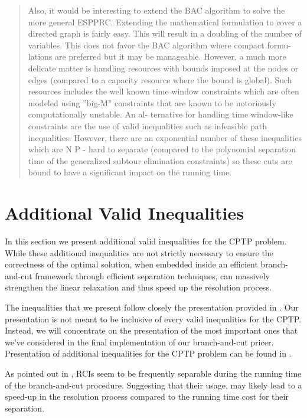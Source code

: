\begin{quote}
	\cite{jepsen2008}
	Also, it would be interesting to extend the BAC algorithm to solve the more general ESPPRC.
	Extending the mathematical formulation to cover a directed graph is fairly easy. This will result in a
	doubling of the number of variables. This does not favor the BAC algorithm where compact formu-
	lations are preferred but it may be manageable. However, a much more delicate matter is handling
	resources with bounds imposed at the nodes or edges (compared to a capacity resource where the
	bound is global). Such resources includes the well known time window constraints which are often
	modeled using ”big-M” constraints that are known to be notoriously computationally unstable. An al-
	ternative for handling time window-like constraints are the use of valid inequalities such as infeasible
	path inequalities. However, there are an exponential number of these inequalities which are N P -
	hard to separate (compared to the polynomial separation time of the generalized subtour elimination
	constraints) so these cuts are bound to have a significant impact on the running time.
\end{quote}


\section{Additional Valid Inequalities}
\label{sec:cptp-additional-valid-inequalities}

In this section we present additional valid inequalities for the CPTP problem.
While these additional inequalities are not strictly necessary
to ensure the correctness of the optimal solution,
when embedded inside an efficient branch-and-cut framework through efficient separation techniques,
can massively strengthen the linear relaxation and thus speed up the resolution process.

The inequalities that we present follow closely the presentation provided in \textcite{jepsen2014}.
Our presentation is not meant to be inclusive of every valid inequalities for the CPTP.
Instead, we will concentrate on the presentation of the most important ones
that we've considered in the final implementation of our branch-and-cut pricer.
Presentation of additional inequalities for the CPTP problem can be found in \textcite{jepsen2014}.

As pointed out in \textcite{jepsen2014},
RCIs seem to be frequently separable during the running time of the branch-and-cut procedure.
Suggesting that their usage, may likely lead to a speed-up in the resolution process
compared to the running time cost for their separation.

